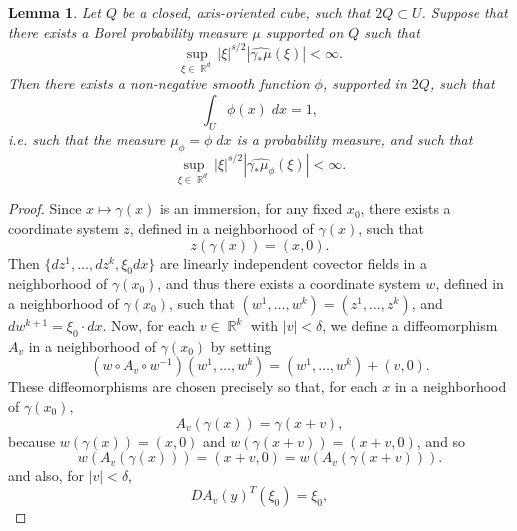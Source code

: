 \documentclass[dvipsnames,letterpaper,12pt]{article}
\DeclareMathOperator{\RR}{\mathbb{R}}
\newtheorem{lemma}[theorem]{Lemma}
\begin{document}
\begin{lemma}
    Let $Q$ be a closed, axis-oriented cube, such that $2Q \subset U$. Suppose that there exists a Borel probability measure $\mu$ supported on $Q$ such that
    \[ \sup_{\xi \in \RR^d} |\xi|^{s/2} |\widehat{\gamma_* \mu}(\xi)| < \infty. \]
    Then there exists a non-negative smooth function $\phi$, supported in $2Q$, such that
    \[ \int_U \phi(x)\; dx = 1, \]
    i.e. such that the measure $\mu_\phi = \phi\; dx$ is a probability measure, and such that
    \[ \sup_{\xi \in \RR^d} |\xi|^{s/2} |\widehat{\gamma_* \mu_\phi}(\xi)| < \infty. \]
\end{lemma}
\begin{proof}

    Since $x \mapsto \gamma(x)$ is an immersion, for any fixed $x_0$, there exists a coordinate system $z$, defined in a neighborhood of $\gamma(x)$, such that
    \[ z(\gamma(x)) = (x,0). \]
    Then $\{ dz^1, \dots, dz^k, \xi_0 dx \}$ are linearly independent covector fields in a neighborhood of $\gamma(x_0)$, and thus there exists a coordinate system $w$, defined in a neighborhood of $\gamma(x_0)$, such that $(w^1,\dots,w^k) = (z^1,\dots,z^k)$, and $dw^{k+1} = \xi_0 \cdot dx$. Now, for each $v \in \RR^k$ with $|v| < \delta$, we define a diffeomorphism $A_v$ in a neighborhood of $\gamma(x_0)$ by setting
    \[ (w \circ A_v \circ w^{-1})(w^1,\dots,w^k) = (w^1,\dots,w^k) + (v,0). \]
    These diffeomorphisms are chosen precisely so that, for each $x$ in a neighborhood of $\gamma(x_0)$,
    \[ A_v( \gamma(x) ) = \gamma(x + v), \]
    because $w(\gamma(x)) = (x,0)$ and $w(\gamma(x + v)) = (x+v,0)$, and so
    \[ w(A_v(\gamma(x))) = (x+v,0) = w(A_v(\gamma(x+v))). \]
    and also, for $|v| < \delta$,
    \[ DA_v(y)^T(\xi_0) = \xi_0, \]




\end{proof}
\end{document}
